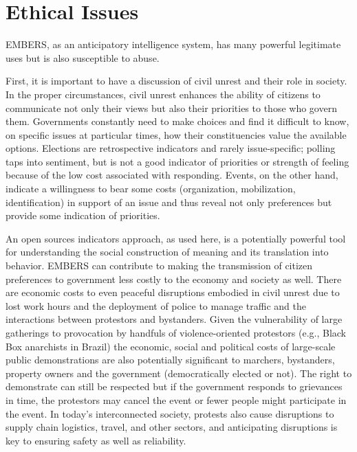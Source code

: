 \section{Ethical Issues}
EMBERS, as an anticipatory intelligence system, has many powerful legitimate uses but is also
susceptible to abuse.  

First, it is important to have a discussion of civil unrest and their role in society.
In the proper circumstances,
civil unrest enhances the ability of citizens to communicate not only their views but also 
their priorities to those who govern them. Governments constantly need to make choices and find 
it difficult to know, on specific issues at particular times, how their constituencies value the available 
options. Elections are retrospective indicators and rarely issue-specific; polling taps into sentiment, 
but is not a good indicator of priorities or strength of feeling because of the 
low cost associated with responding. Events, on the other hand, indicate a willingness to 
bear some costs (organization, mobilization, identification) in support of an issue and 
thus reveal not only preferences but provide some indication of priorities. 

An open sources indicators approach, as used here, is a potentially powerful 
tool for understanding the social construction of meaning and its translation into behavior. 
EMBERS can contribute to making the transmission of citizen preferences to government less costly to the economy and society as well. There are economic costs to even peaceful disruptions embodied in civil unrest due to lost work hours and the deployment of police to manage traffic and the interactions between protestors and bystanders. Given the vulnerability of large gatherings to provocation by handfuls of violence-oriented protestors 
(e.g., Black Box anarchists in Brazil) the economic, social and political costs of 
large-scale public demonstrations are also potentially significant to marchers, bystanders, property owners 
and the government (democratically elected or not). The right to demonstrate can still 
be respected but if the government responds to grievances in time,
the protestors may cancel the event or fewer people might participate in the event. 
In today's interconnected society, protests also cause disruptions to supply chain logistics, travel, and
other sectors, and anticipating disruptions is key to ensuring safety as well as reliability.
 
